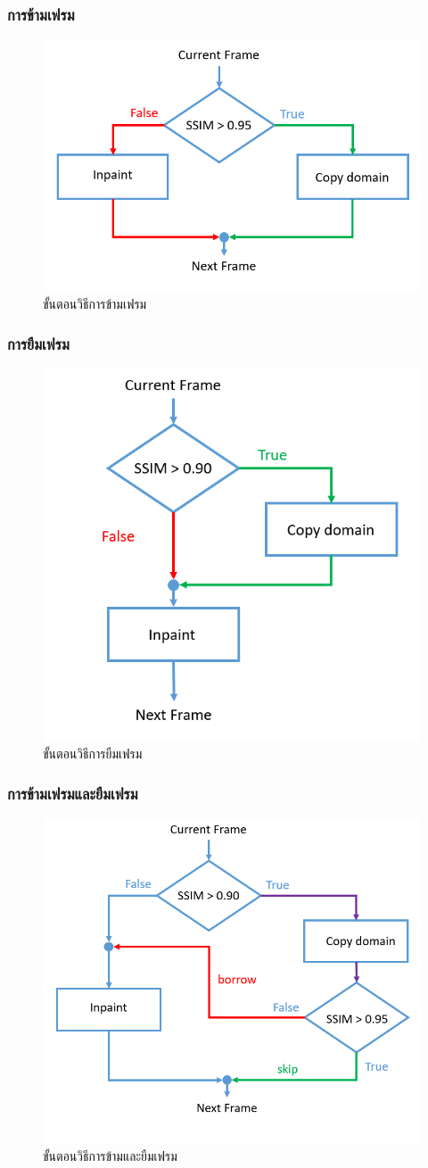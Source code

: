 \documentclass[xcolor=dvipsnames, xetex,serif]{beamer}
\numberwithin{equation}{section}
\begin{document}
    \begin{frame}
        \frametitle{การข้ามเฟรม}  
        \begin{figure}[H]
            \centering
            \includegraphics[width=0.6\linewidth]{images/skipborrow/flowchart-skip.png}
            \caption{ขั้นตอนวิธีการข้ามเฟรม}
        \end{figure}      
    \end{frame}
    \begin{frame}
        \frametitle{การยืมเฟรม}      
        \begin{figure}[H]
            \centering
            \includegraphics[width=0.6\linewidth]{images/skipborrow/flowchart-borrow.png}
            \caption{ขั้นตอนวิธีการยืมเฟรม}
        \end{figure}   
    \end{frame}
    \begin{frame}
        \frametitle{การข้ามเฟรมและยืมเฟรม}  
        \begin{figure}[H]
            \centering
            \includegraphics[width=0.6\linewidth]{images/skipborrow/flowchart-skipandborrow.png}
            \caption{ขั้นตอนวิธีการข้ามและยืมเฟรม}
        \end{figure}        
    \end{frame}
\end{document}
